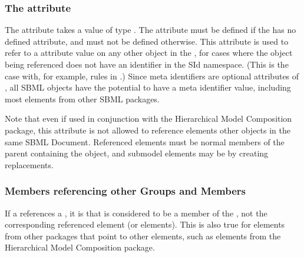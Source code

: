 \subsubsection{The \fixttspace{} attribute}
\label{member-metaidref-attribute}

The \Member attribute  takes a value of type .  The attribute must be defined if the \Member has no defined  attribute, and must not be defined otherwise.  This attribute is used to refer to a  attribute value on any other object in the \Model, for cases where the object being referenced does not have an identifier in the \Model SId namespace.  (This is the case with, for example, rules in \sbmlthreecore.)  Since meta identifiers are optional attributes of \SBase, all SBML objects have the potential to have a meta identifier value, including most elements from other SBML packages.

Note that even if used in conjunction with the Hierarchical Model Composition package, this attribute is not allowed to reference elements  other \Model objects in the same SBML Document.  Referenced elements must be normal members of the parent \Model containing the \Member object, and submodel elements may be  by creating replacements.


\subsubsection{Members referencing other Groups and Members}
\label{nested-groups}

If a \Member references a \Group, it is  that is considered to be a member of the  \Group, not the corresponding referenced element (or elements).  This is also true for elements from other packages that point to other elements, such as \SBaseRef elements from the Hierarchical Model Composition package.  


